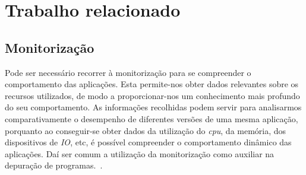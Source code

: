 \chapter{Trabalho relacionado}
\label{cap:trabrelacionado}

 
% 
% 


\section{Monitorização} \label{sect:descricao}

Pode ser necessário recorrer à monitorização para se compreender o comportamento das aplicações.
Esta permite-nos obter dados relevantes sobre os recursos utilizados, de modo a proporcionar-nos um conhecimento mais profundo do seu comportamento.
As informações recolhidas podem servir para analisarmos comparativamente o desempenho de diferentes versões de uma mesma aplicação, porquanto ao conseguir-se obter dados da utilização do \textit{cpu}, da memória, dos dispositivos de \textit{IO}, etc, é possível compreender o comportamento dinâmico das aplicações.
Daí ser comum a utilização da monitorização como auxiliar na depuração de programas.~\cite{DuartePhd05}.

